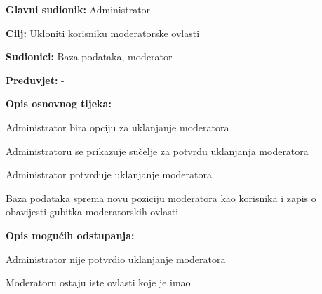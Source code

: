 \noindent {}
\begin{packed_item}

\item \textbf{Glavni sudionik:} Administrator
\item  \textbf{Cilj:} Ukloniti korisniku moderatorske ovlasti
\item  \textbf{Sudionici:} Baza podataka, moderator
\item  \textbf{Preduvjet:} -
\item  \textbf{Opis osnovnog tijeka:}

\item[] \begin{packed_enum}

    \item Administrator bira opciju za uklanjanje moderatora
    \item Administratoru se prikazuje sučelje za potvrdu uklanjanja moderatora
    \item Administrator potvrđuje uklanjanje moderatora
    \item Baza podataka sprema novu poziciju moderatora kao korisnika i zapis o obavijesti gubitka moderatorskih ovlasti

\end{packed_enum}

\item  \textbf{Opis mogućih odstupanja:}

\item[] \begin{packed_item}

    \item[3.a] Administrator nije potvrdio uklanjanje moderatora
    \item[] \begin{packed_enum}

        \item Moderatoru ostaju iste ovlasti koje je imao

    \end{packed_enum}

\end{packed_item}
\end{packed_item}

